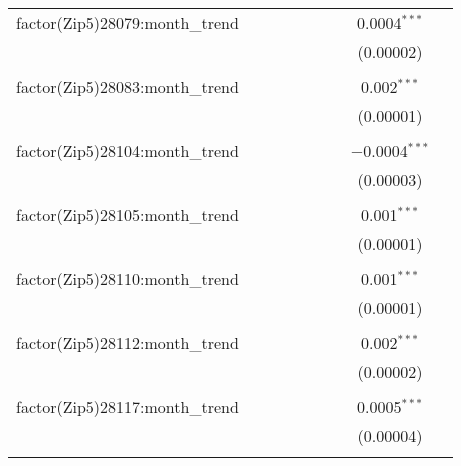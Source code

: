 \begin{table}[H]
{\begin{tabular}{@{\extracolsep{5pt}}lcccccccc}
  factor(Zip5)28079:month\_trend &  &  &  &  &  &  & 0.0004$^{***}$ &  \\  

   &  &  &  &  &  &  & (0.00002) &  \\  

   & & & & & & & & \\  

  factor(Zip5)28083:month\_trend &  &  &  &  &  &  & 0.002$^{***}$ &  \\  

   &  &  &  &  &  &  & (0.00001) &  \\  

   & & & & & & & & \\  

  factor(Zip5)28104:month\_trend &  &  &  &  &  &  & $-$0.0004$^{***}$ &  \\  

   &  &  &  &  &  &  & (0.00003) &  \\  

   & & & & & & & & \\  

  factor(Zip5)28105:month\_trend &  &  &  &  &  &  & 0.001$^{***}$ &  \\  

   &  &  &  &  &  &  & (0.00001) &  \\  

   & & & & & & & & \\  

  factor(Zip5)28110:month\_trend &  &  &  &  &  &  & 0.001$^{***}$ &  \\  

   &  &  &  &  &  &  & (0.00001) &  \\  

   & & & & & & & & \\  

  factor(Zip5)28112:month\_trend &  &  &  &  &  &  & 0.002$^{***}$ &  \\  

   &  &  &  &  &  &  & (0.00002) &  \\  

   & & & & & & & & \\  

  factor(Zip5)28117:month\_trend &  &  &  &  &  &  & 0.0005$^{***}$ &  \\  

   &  &  &  &  &  &  & (0.00004) &  \\  

   & & & & & & & & \\  


\end{tabular}}
\end{table}
